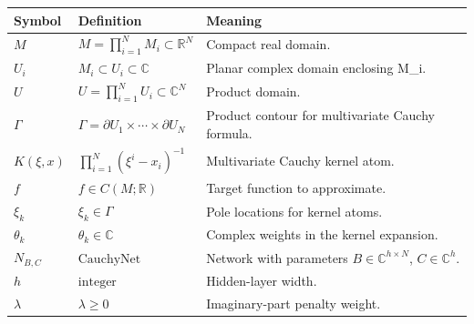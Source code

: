 \begin{tabular}{lll}
Symbol & Definition & Meaning \\
\hline
$M$ & $M=\prod_{i=1}^N M_i\subset\mathbb{R}^N$ & Compact real domain. \\
$U_i$ & $M_i\subset U_i\subset\mathbb{C}$ & Planar complex domain enclosing M_i. \\
$U$ & $U=\prod_{i=1}^N U_i\subset\mathbb{C}^N$ & Product domain. \\
$\Gamma$ & $\Gamma=\partial U_1\times\cdots\times\partial U_N$ & Product contour for multivariate Cauchy formula. \\
$K(\xi,x)$ & $\prod_{i=1}^N(\xi^i-x_i)^{-1}$ & Multivariate Cauchy kernel atom. \\
$f$ & $f\in C(M;\mathbb{R})$ & Target function to approximate. \\
$\xi_k$ & $\xi_k\in\Gamma$ & Pole locations for kernel atoms. \\
$\theta_k$ & $\theta_k\in\mathbb{C}$ & Complex weights in the kernel expansion. \\
$N_{B,C}$ & $\mathrm{CauchyNet}$ & Network with parameters $B\in\mathbb{C}^{h\times N}$, $C\in\mathbb{C}^h$. \\
$h$ & $\mathrm{integer}$ & Hidden-layer width. \\
$\lambda$ & $\lambda\geq0$ & Imaginary-part penalty weight. \\
\end{tabular}
